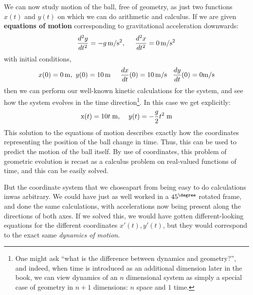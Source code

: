 \documentclass[../master.tex]{subfiles}
\begin{document}
	
	We can now study motion of the ball, free of geometry, as just two functions $x(t)$ and $y(t)$ on which we can do arithmetic and calculus. If we are given \textbf{equations of motion} corresponding to gravitational acceleration downwards: 
	\begin{equation*}
		\frac{d^2y}{dt^2} = -g \, \mathrm{m/s^2}, \hspace{5mm} \frac{d^2x}{dt^2} = 0 \, \mathrm{m/s^2}
	\end{equation*} 
	with initial conditions,
	\begin{equation*}
		x(0) = 0 \,\mathrm m,~ y(0) = 10 \,\mathrm m \hspace{5mm} \frac{dx}{dt}(0) = 10 \, \mathrm{m/s} \hspace{3mm} \frac{dy}{dt}(0) = 0 \mathrm{m/s}
	\end{equation*}
	 then we can perform our well-known kinetic calculations for the system, and see how the system evolves in the time direction\footnote{One might ask ``what is the difference between dynamics and geometry?'', and indeed, when time is introduced as an additional dimension later in the book, we can view dynamics of an $n$ dimensional system as simply a special case of geometry in $n+1$ dimensions: $n$ space and $1$ time.}. In this case we get explicitly:
	 \begin{equation*}
	 	\mathrm x(t) = 10 t \; \mathrm m, \hspace{4mm} y(t) = - \frac{g}{2}t^2 \; \mathrm m
	 \end{equation*}
	 This solution to the equations of motion describes exactly how the coordinates representing the position of the ball change in time. Thus, this can be used to predict the motion of the ball itself. By use of coordinates, this problem of geometric evolution is recast as a calculus problem on real-valued functions of time, and this can be easily solved.
	 
	 But the coordinate system that we chose\textemdash apart from being easy to do calculations in\textemdash was arbitrary. We could have just as well worked in a $45^\degree$ rotated frame, and done the same calculations, with accelerations now being present along the directions of both axes. If we solved this, we would have gotten different-looking equations for the different coordinates $x'(t), y'(t)$, but they would correspond to the exact same \emph{dynamics of motion}.
	
	
\end{document}
